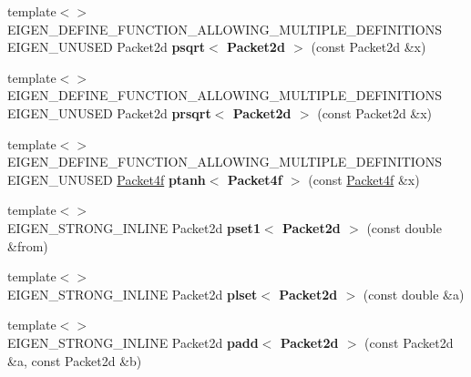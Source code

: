 \begin{DoxyCompactItemize}
{\footnotesize template$<$$>$ }\\E\+I\+G\+E\+N\+\_\+\+D\+E\+F\+I\+N\+E\+\_\+\+F\+U\+N\+C\+T\+I\+O\+N\+\_\+\+A\+L\+L\+O\+W\+I\+N\+G\+\_\+\+M\+U\+L\+T\+I\+P\+L\+E\+\_\+\+D\+E\+F\+I\+N\+I\+T\+I\+O\+NS E\+I\+G\+E\+N\+\_\+\+U\+N\+U\+S\+ED Packet2d {\bfseries psqrt$<$ Packet2d $>$} (const Packet2d \&x)
\item 
\mbox{\label{namespace_eigen_1_1internal_af30b2121ee9aa563c033f6332fb4243e}} 
{\footnotesize template$<$$>$ }\\E\+I\+G\+E\+N\+\_\+\+D\+E\+F\+I\+N\+E\+\_\+\+F\+U\+N\+C\+T\+I\+O\+N\+\_\+\+A\+L\+L\+O\+W\+I\+N\+G\+\_\+\+M\+U\+L\+T\+I\+P\+L\+E\+\_\+\+D\+E\+F\+I\+N\+I\+T\+I\+O\+NS E\+I\+G\+E\+N\+\_\+\+U\+N\+U\+S\+ED Packet2d {\bfseries prsqrt$<$ Packet2d $>$} (const Packet2d \&x)
\item 
\mbox{\label{namespace_eigen_1_1internal_a74c125271290cd7011e9e673e34c819a}} 
{\footnotesize template$<$$>$ }\\E\+I\+G\+E\+N\+\_\+\+D\+E\+F\+I\+N\+E\+\_\+\+F\+U\+N\+C\+T\+I\+O\+N\+\_\+\+A\+L\+L\+O\+W\+I\+N\+G\+\_\+\+M\+U\+L\+T\+I\+P\+L\+E\+\_\+\+D\+E\+F\+I\+N\+I\+T\+I\+O\+NS E\+I\+G\+E\+N\+\_\+\+U\+N\+U\+S\+ED \hyperlink{struct_eigen_1_1internal_1_1_packet4f}{Packet4f} {\bfseries ptanh$<$ Packet4f $>$} (const \hyperlink{struct_eigen_1_1internal_1_1_packet4f}{Packet4f} \&x)
\item 
\mbox{\label{namespace_eigen_1_1internal_a6024368181b050eb03ef7eea98f084ea}} 
{\footnotesize template$<$$>$ }\\E\+I\+G\+E\+N\+\_\+\+S\+T\+R\+O\+N\+G\+\_\+\+I\+N\+L\+I\+NE Packet2d {\bfseries pset1$<$ Packet2d $>$} (const double \&from)
\item 
\mbox{\label{namespace_eigen_1_1internal_a997a475a7aab55264d8b830068e65106}} 
{\footnotesize template$<$$>$ }\\E\+I\+G\+E\+N\+\_\+\+S\+T\+R\+O\+N\+G\+\_\+\+I\+N\+L\+I\+NE Packet2d {\bfseries plset$<$ Packet2d $>$} (const double \&a)
\item 
\mbox{\label{namespace_eigen_1_1internal_a130a074afefb80e3e5a21127e1fa9a2c}} 
{\footnotesize template$<$$>$ }\\E\+I\+G\+E\+N\+\_\+\+S\+T\+R\+O\+N\+G\+\_\+\+I\+N\+L\+I\+NE Packet2d {\bfseries padd$<$ Packet2d $>$} (const Packet2d \&a, const Packet2d \&b)

\end{DoxyCompactItemize}
